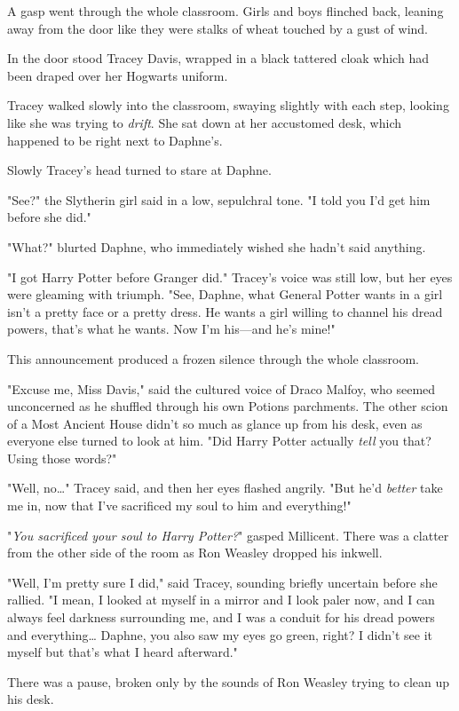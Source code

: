 A gasp went through the whole classroom. Girls and boys flinched back, leaning
away from the door like they were stalks of wheat touched by a gust of wind.

In the door stood Tracey Davis, wrapped in a black tattered cloak which had
been draped over her Hogwarts uniform.

Tracey walked slowly into the classroom, swaying slightly with each step,
looking like she was trying to \emph{drift}. She sat down at her accustomed
desk, which happened to be right next to Daphne's.

Slowly Tracey's head turned to stare at Daphne.

"See?" the Slytherin girl said in a low, sepulchral tone. "I told you I'd get
him before she did."

"What?" blurted Daphne, who immediately wished she hadn't said anything.

"I got Harry Potter before Granger did." Tracey's voice was still low, but her
eyes were gleaming with triumph. "See, Daphne, what General Potter wants in a
girl isn't a pretty face or a pretty dress. He wants a girl willing to channel
his dread powers, that's what he wants. Now I'm his---and he's mine!"

This announcement produced a frozen silence through the whole classroom.

"Excuse me, Miss Davis," said the cultured voice of Draco Malfoy, who seemed
unconcerned as he shuffled through his own Potions parchments. The other scion
of a Most Ancient House didn't so much as glance up from his desk, even as
everyone else turned to look at him. "Did Harry Potter actually \emph{tell} you
that? Using those words?"

"Well, no{\ldots}" Tracey said, and then her eyes flashed angrily. "But he'd
\emph{better} take me in, now that I've sacrificed my soul to him and
everything!"

"\emph{You sacrificed your soul to Harry Potter?}" gasped Millicent. There was
a clatter from the other side of the room as Ron Weasley dropped his inkwell.

"Well, I'm pretty sure I did," said Tracey, sounding briefly uncertain before
she rallied. "I mean, I looked at myself in a mirror and I look paler now, and
I can always feel darkness surrounding me, and I was a conduit for his dread
powers and everything{\ldots} Daphne, you also saw my eyes go green, right? I
didn't see it myself but that's what I heard afterward."

There was a pause, broken only by the sounds of Ron Weasley trying to clean up
his desk.

